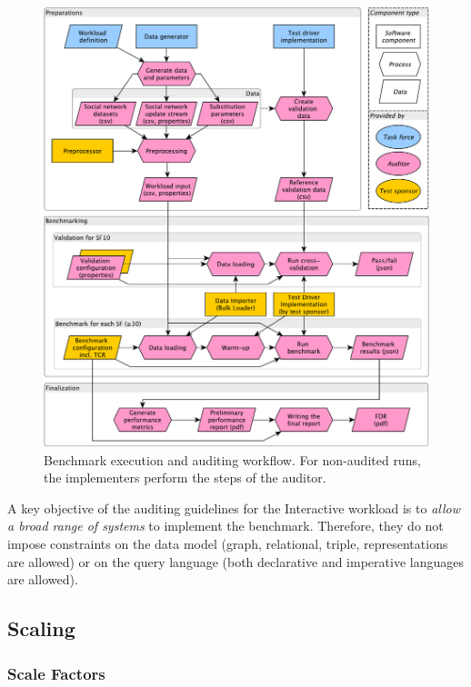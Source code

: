 \begin{figure}[h]
    \centering
    \includegraphics[scale=\yedscale]{figures/auditing-workflow}
    \caption{Benchmark execution and auditing workflow. For non-audited runs, the implementers perform the steps of the auditor.}
    \label{fig:audit-workflow}
\end{figure}

A key objective of the auditing guidelines for the Interactive workload is to \emph{allow a broad range of systems} to implement the benchmark.
Therefore, they do not impose constraints on the data model
(graph, relational, triple, \etc representations are allowed)
or on the query language
(both declarative and imperative languages are allowed).

\subsection{Scaling}
\label{sec:int-scaling}

\subsubsection{Scale Factors}

